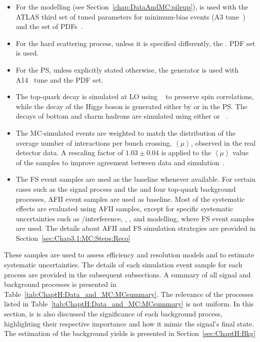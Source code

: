 \begin{itemize}
	\item For the \pileup modelling (see Section~\ref{chap:DataAndMC:pileup}), \PYTHIA[8.186]
	is used with the ATLAS third set of tuned parameters for minimum-bias events 
	(A3 tune~\cite{ATL-PHYS-PUB-2016-017}) and the \NNPDF[2.3lo] set of PDFs~\cite{Ball:2012cx}.

	\item For the hard scattering process, unless it is specified differently, 
	the \NNPDF[3.0nlo]. PDF set is used.

	\item For the PS, unless explicitly stated otherwise, the \PYTHIA generator is used with 
	A14~\cite{ATL-PHYS-PUB-2014-021} tune and the \NNPDF[2.3lo] PDF set.
	
	\item The top-quark decay is simulated at LO using \MADSPIN~\cite{Frixione:2007vw, Artoisenet:2012st} 
	to preserve spin correlations, while the decay of the Higgs boson is generated either by \PYTHIA[8] 
	or \HERWIG[7] in the PS. 
	The decays of bottom and charm hadrons are simulated using either \EVTGEN[1.6.0] 
	or \EVTGEN[1.7.0]~\cite{Lange:2001uf}.

	\item	The MC-simulated events are weighted to match the distribution of the average 
	number of interactions per bunch crossing, \(\left<\mu \right>\), observed in the 
	real detector data. A rescaling factor of \(1.03\pm 0.04\) is applied 
	to the $\left<\mu \right>$ value of the samples to improve agreement between 
	data and simulation~\cite{STDM-2015-05}.%
 
	\item	The FS event samples are used as the baseline whenever 
	available. For certain cases such as the \tHq signal process and the \tHW
	and four top-quark background processes, AFII event samples are used as baseline.
	Most of the systematic effects are evaluated using AFII samples, except for 
	specific systematic uncertainties such as \ttbar/\tW interference, \ttZ, \ttW, and \tWZ 
	modelling, where FS event samples are used. 
	The details about AFII and FS simulation strategies are
	provided in Section~\ref{sec:Chap3.1:MC:Steps:Reco}
\end{itemize}

These samples are used to assess efficiency and resolution models and to estimate 
systematic uncertainties. The details of each simulation event sample for each process 
are provided in the subsequent subsections.
 A summary of all \tHq signal and background processes 
is presented in Table~\ref{tab:ChaptH:Data_and_MC:MCsummary}. 
The relevance of the processes 
listed in Table~\ref{tab:ChaptH:Data_and_MC:MCsummary} is not uniform.
In this section, is is also discussed the significance of each background process, highlighting 
their respective importance and how it mimic the signal's final state. The estimation of the
background yields is presented in Section~\ref{sec:ChaptH:Bkg} 




